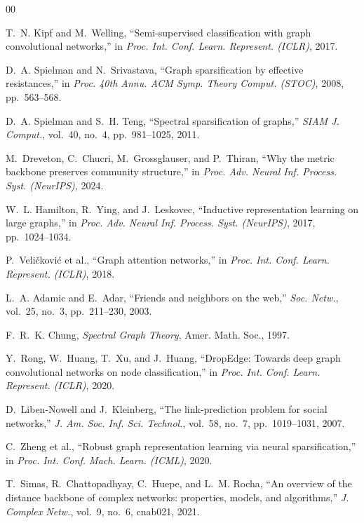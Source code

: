 \documentclass[conference]{IEEEtran}
\begin{document}

\begin{thebibliography}{00}

 T.~N. Kipf and M.~Welling, ``Semi-supervised classification with graph convolutional networks,'' in \emph{Proc. Int. Conf. Learn. Represent. (ICLR)}, 2017.

 D.~A. Spielman and N.~Srivastava, ``Graph sparsification by effective resistances,'' in \emph{Proc. 40th Annu. ACM Symp. Theory Comput. (STOC)}, 2008, pp.~563--568.

 D.~A. Spielman and S.~H. Teng, ``Spectral sparsification of graphs,'' \emph{SIAM J. Comput.}, vol.~40, no.~4, pp.~981--1025, 2011.

 M.~Dreveton, C.~Chucri, M.~Grossglauser, and P.~Thiran, ``Why the metric backbone preserves community structure,'' in \emph{Proc. Adv. Neural Inf. Process. Syst. (NeurIPS)}, 2024.

 W.~L. Hamilton, R.~Ying, and J.~Leskovec, ``Inductive representation learning on large graphs,'' in \emph{Proc. Adv. Neural Inf. Process. Syst. (NeurIPS)}, 2017, pp.~1024--1034.

 P.~Veli\v{c}kovi\'{c} et al., ``Graph attention networks,'' in \emph{Proc. Int. Conf. Learn. Represent. (ICLR)}, 2018.

 L.~A. Adamic and E.~Adar, ``Friends and neighbors on the web,'' \emph{Soc. Netw.}, vol.~25, no.~3, pp.~211--230, 2003.

 F.~R.~K. Chung, \emph{Spectral Graph Theory}, Amer. Math. Soc., 1997.

 Y.~Rong, W.~Huang, T.~Xu, and J.~Huang, ``DropEdge: Towards deep graph convolutional networks on node classification,'' in \emph{Proc. Int. Conf. Learn. Represent. (ICLR)}, 2020.

 D.~Liben-Nowell and J.~Kleinberg, ``The link-prediction problem for social networks,'' \emph{J. Am. Soc. Inf. Sci. Technol.}, vol.~58, no.~7, pp.~1019--1031, 2007.

 C.~Zheng et al., ``Robust graph representation learning via neural sparsification,'' in \emph{Proc. Int. Conf. Mach. Learn. (ICML)}, 2020.

 T.~Simas, R.~Chattopadhyay, C.~Huepe, and L.~M. Rocha, ``An overview of the distance backbone of complex networks: properties, models, and algorithms,'' \emph{J. Complex Netw.}, vol.~9, no.~6, cnab021, 2021.

\end{thebibliography}
\end{document}
